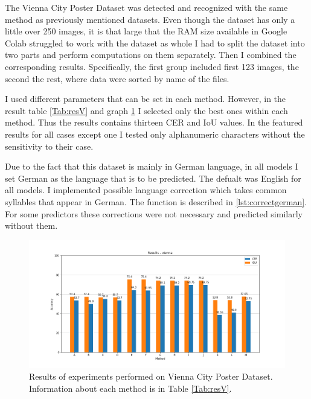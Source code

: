 The Vienna City Poster Dataset was detected and recognized with the same method as previously mentioned datasets. Even though the dataset has only a little over 250 images, it is that large that the RAM size available in Google Colab struggled to work with the dataset as whole I had to split the dataset into two parts and perform computations on them separately. Then I combined the corresponding results. Specifically, the first group included first 123 images, the second the rest, where data were sorted by name of the files.

I used different parameters that can be set in each method. However, in the result table \ref{Tab:resV} and graph \ref*{Im:resV} I selected only the best ones within each method. Thus the results contains     thirteen CER and IoU values. In the featured results for all cases except one I tested only alphanumeric characters without the sensitivity to their case.

Due to the fact that this dataset is mainly in German language, in all models I set German as the language that is to be predicted. The defualt was English for all models. I implemented possible language correction which takes common syllables that appear in German. The function is described in \ref{lst:correctgerman}. For some predictors these corrections were not necessary and predicted similarly without them. 

\begin{figure}[hbtp!]
    \centering
    \includegraphics[width=\textwidth]{obrazky/grafy/resvienna.png}
    \caption{Results of experiments performed on Vienna City Poster Dataset. Information about each method is in Table \ref{Tab:resV}.}
    \label{Im:resV}
\end{figure}

